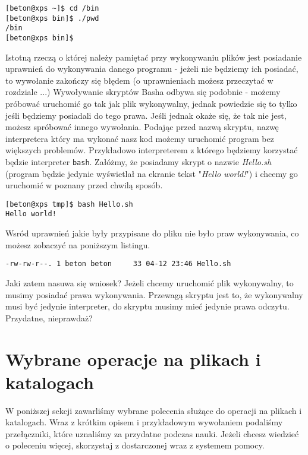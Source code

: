 \begin{verbatim}
[beton@xps ~]$ cd /bin
[beton@xps bin]$ ./pwd 
/bin
[beton@xps bin]$ 
\end{verbatim}
Istotną rzeczą o której należy pamiętać przy wykonywaniu plików jest posiadanie uprawnień do wykonywania danego programu - jeżeli nie będziemy ich posiadać, to wywołanie zakończy się błędem (o uprawnieniach możesz przeczytać w rozdziale ...) %
\newline
\newline
Wywoływanie skryptów Basha odbywa się podobnie - możemy próbować uruchomić go tak jak plik wykonywalny, jednak powiedzie się to tylko jeśli będziemy posiadali do tego prawa. Jeśli jednak okaże się, że tak nie jest, możesz spróbować innego wywołania. Podając przed nazwą skryptu, nazwę interpretera który ma wykonać nasz kod możemy uruchomić program bez większych problemów. Przykładowo interpreterem z którego będziemy korzystać będzie interpreter \texttt{bash}. Załóżmy, że posiadamy skrypt o nazwie \textit{Hello.sh} (program będzie jedynie wyświetlał na ekranie tekst 
"\textit{Hello world!}") i chcemy go uruchomić w poznany przed chwilą sposób.
\begin{verbatim}
[beton@xps tmp]$ bash Hello.sh 
Hello world!
\end{verbatim} 
Wsród uprawnień jakie były przypisane do pliku nie było praw wykonywania, co możesz zobaczyć na poniższym listingu.
\begin{verbatim}
-rw-rw-r--. 1 beton beton     33 04-12 23:46 Hello.sh
\end{verbatim}
Jaki zatem nasuwa się wniosek? Jeżeli chcemy uruchomić plik wykonywalny, to musimy posiadać prawa wykonywania. Przewagą skryptu jest to, że wykonywalny musi być jedynie interpreter, do skryptu musimy mieć jedynie prawa odczytu. Przydatne, nieprawdaż?

\section{Wybrane operacje na plikach i katalogach}
W poniższej sekcji zawarliśmy wybrane polecenia służące do operacji na plikach i katalogach. Wraz z krótkim opisem i przykładowym wywołaniem podaliśmy przełączniki, które uznaliśmy za przydatne podczas nauki. Jeżeli chcesz wiedzieć o poleceniu więcej, skorzystaj z dostarczonej wraz z systemem pomocy.

